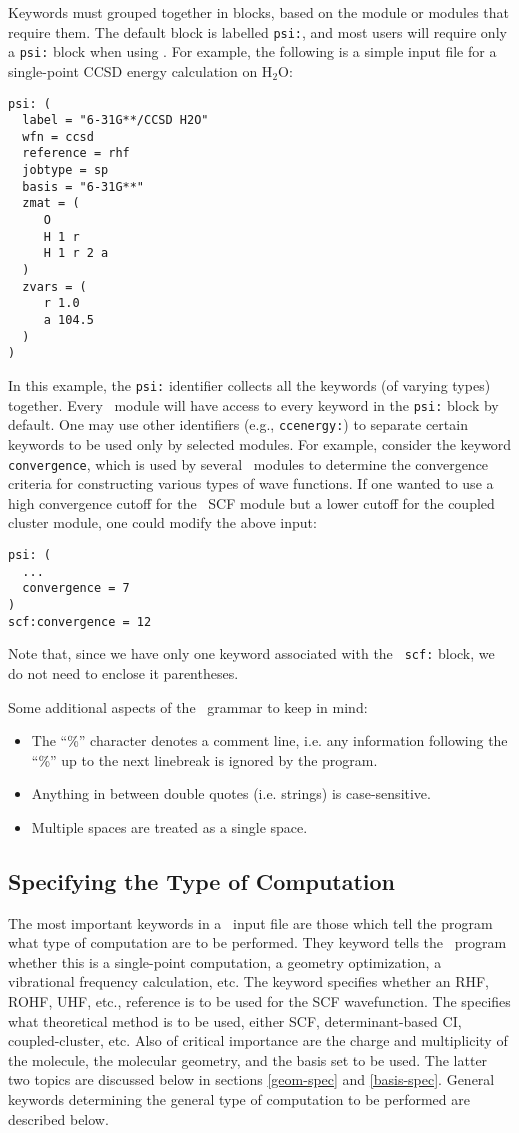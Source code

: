 Keywords must grouped together in blocks, based on the module or
modules that require them.  The default block is labelled {\tt psi:},
and most users will require only a {\tt psi:} block when using
\PSIthree.  For example, the following is a simple input file for a
single-point CCSD energy calculation on H$_2$O:
\begin{verbatim}
psi: (
  label = "6-31G**/CCSD H2O"
  wfn = ccsd
  reference = rhf
  jobtype = sp
  basis = "6-31G**"
  zmat = (
     O
     H 1 r 
     H 1 r 2 a 
  )
  zvars = (
     r 1.0 
     a 104.5 
  )
)
\end{verbatim}
In this example, the {\tt psi:} identifier collects all the keywords
(of varying types) together.  Every \PSIthree\ module will have access
to every keyword in the {\tt psi:} block by default.  One may use
other identifiers (e.g., {\tt ccenergy:}) to separate certain keywords
to be used only by selected modules.  For example, consider the
keyword {\tt convergence}, which is used by several \PSIthree\ modules
to determine the convergence criteria for constructing various types
of wave functions.  If one wanted to use a high convergence cutoff for the
\PSIthree\ SCF module but a lower cutoff for the coupled cluster
module, one could modify the above input:
\begin{verbatim}
psi: (
  ...
  convergence = 7
)
scf:convergence = 12
\end{verbatim}
Note that, since we have only one keyword associated with the {\tt
  scf:} block, we do not need to enclose it parentheses.

Some additional aspects of the \PSIthree\ grammar to keep in mind:
\begin{itemize}
\item The ``\%'' character denotes a comment line, i.e. any
  information following the ``\%'' up to the next linebreak is ignored
  by the program.
\item Anything in between double quotes (i.e. strings) is case-sensitive.
\item Multiple spaces are treated as a single space.
\end{itemize}

\subsection{Specifying the Type of Computation}
The most important keywords in a \PSIthree\ input file are those which
tell the program what type of computation are to be performed.  
They  keyword tells the \PSIdriver\ program whether
this is a single-point computation, a geometry optimization, a 
vibrational frequency calculation, etc.  The  
keyword specifies whether an RHF, ROHF, UHF, etc., reference is
to be used for the SCF wavefunction.  The  specifies 
what theoretical method is to be used, either SCF, determinant-based
CI, coupled-cluster, etc.  Also of critical importance are the charge
and multiplicity of the molecule, the molecular geometry, and the
basis set to be used.  The latter two topics are discussed below
in sections \ref{geom-spec} and \ref{basis-spec}.
General keywords determining the general type of computation to be performed 
are described below.

